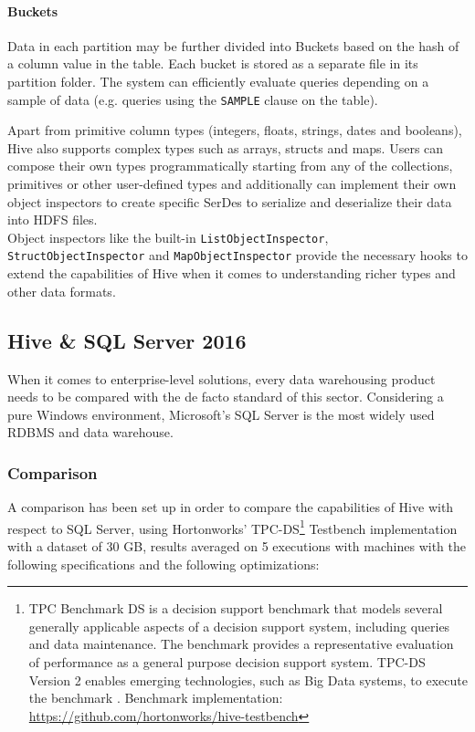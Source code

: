 \paragraph{Buckets} Data in each partition may be further divided into Buckets based on the hash of a column value in the table. Each bucket is stored as a separate file in its partition folder. The system can efficiently evaluate queries depending on a sample of data (e.g. queries using the \texttt{SAMPLE} clause on the table).
\newline
\par
Apart from primitive column types (integers, floats, strings, dates and booleans), Hive also supports complex types such as arrays, structs and maps. Users can compose their own types programmatically starting from any of the collections, primitives or other user-defined types and additionally can implement their own object inspectors to create specific SerDes to serialize and deserialize their data into HDFS files.\\
Object inspectors like the built-in \texttt{ListObjectInspector}, \texttt{StructObjectInspector} and \texttt{MapObjectInspector} provide the necessary hooks to extend the capabilities of Hive when it comes to understanding richer types and other data formats.

\subsection{Hive \& SQL Server 2016}

When it comes to enterprise-level solutions, every data warehousing product needs to be compared with the de facto standard of this sector. Considering a pure Windows environment, Microsoft's SQL Server is the most widely used RDBMS and data warehouse.\newline

\subsubsection{Comparison}

A comparison has been set up in order to compare the capabilities of Hive with respect to SQL Server, using Hortonworks' TPC-DS\footnote{TPC Benchmark DS is a decision support benchmark that models several generally applicable aspects of a decision support system, including queries and data maintenance. The benchmark provides a representative evaluation of performance as a general purpose decision support system. TPC-DS Version 2 enables emerging technologies, such as Big Data systems, to execute the benchmark \cite{tpcds} . Benchmark implementation: \href{https://github.com/hortonworks/hive-testbench}{https://github.com/hortonworks/hive-testbench}} Testbench implementation with a dataset of 30 GB, results averaged on 5 executions with machines with the following specifications and the following optimizations:
\newline

